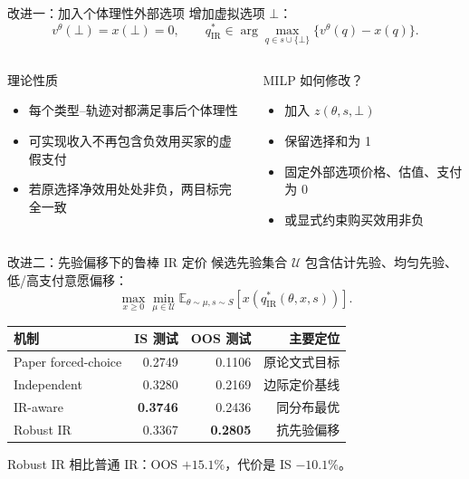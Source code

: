 \documentclass[aspectratio=169,10pt]{ctexbeamer}
\newcommand{\E}{\mathbb E}
\begin{document}
\begin{frame}{改进一：加入个体理性外部选项}
增加虚拟选项 $\bot$：
\[
v^\theta(\bot)=x(\bot)=0,\qquad
q^*_{\mathrm{IR}}\in\arg\max_{q\in s\cup\{\bot\}}
\{v^\theta(q)-x(q)\}.
\]
\begin{columns}[T,onlytextwidth]
\begin{exampleblock}{理论性质}
\begin{itemize}
  \item 每个类型--轨迹对都满足事后个体理性
  \item 可实现收入不再包含负效用买家的虚假支付
  \item 若原选择净效用处处非负，两目标完全一致
\end{itemize}
\end{exampleblock}
\begin{block}{MILP 如何修改？}
\begin{itemize}
  \item 加入 $z(\theta,s,\bot)$
  \item 保留选择和为 1
  \item 固定外部选项价格、估值、支付为 0
  \item 或显式约束购买效用非负
\end{itemize}
\end{block}
\end{columns}
\end{frame}

\begin{frame}{改进二：先验偏移下的鲁棒 IR 定价}
候选先验集合 $\mathcal U$ 包含估计先验、均匀先验、低/高支付意愿偏移：
\[
\max_{x\ge0}\min_{\mu\in\mathcal U}
\E_{\theta\sim\mu,s\sim S}
[x(q^*_{\mathrm{IR}}(\theta,x,s))].
\]
\begin{table}
\centering
\small
\begin{tabular}{lrrr}
\toprule
机制 & IS 测试 & OOS 测试 & 主要定位\\
\midrule
Paper forced-choice & 0.2749 & 0.1106 & 原论文式目标\\
Independent & 0.3280 & 0.2169 & 边际定价基线\\
IR-aware & \textbf{0.3746} & 0.2436 & 同分布最优\\
Robust IR & 0.3367 & \textbf{0.2805} & 抗先验偏移\\
\bottomrule
\end{tabular}
\end{table}
\centering
Robust IR 相比普通 IR：OOS $+15.1\%$，代价是 IS $-10.1\%$。
\end{frame}
\end{document}

